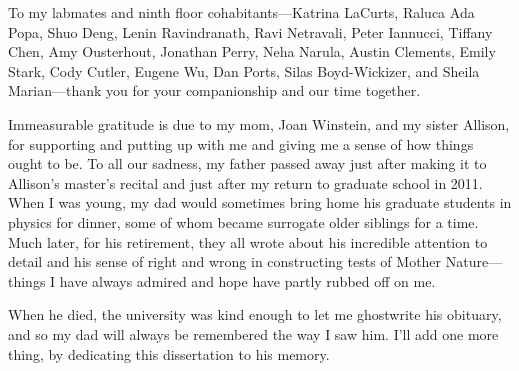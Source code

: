 To my labmates and ninth floor cohabitants---Katrina LaCurts, Raluca
Ada Popa, Shuo Deng, Lenin Ravindranath, Ravi Netravali, Peter
Iannucci, Tiffany Chen, Amy Ousterhout, Jonathan Perry, Neha Narula,
Austin Clements, Emily Stark, Cody Cutler, Eugene Wu, Dan Ports, Silas
Boyd-Wickizer, and Sheila Marian---thank you for your companionship
and our time together.

Immeasurable gratitude is due to my mom, Joan Winstein, and my sister Allison,
for supporting and putting up with me and giving me a sense of how
things ought to be. To all our sadness, my father passed away just
after making it to Allison's master's recital and just after my return
to graduate school in 2011. When I was young, my dad would sometimes
bring home his graduate students in physics for dinner, some of whom
became surrogate older siblings for a time. Much later, for his
retirement, they all wrote about his incredible attention to detail
and his sense of right and wrong in constructing tests of Mother
Nature---things I have always admired and hope have partly
rubbed off on me.

When he died, the university was kind enough to let me ghostwrite his
obituary, and so my dad will always be remembered the way I saw
him. I'll add one more thing, by dedicating this dissertation to his
memory.
